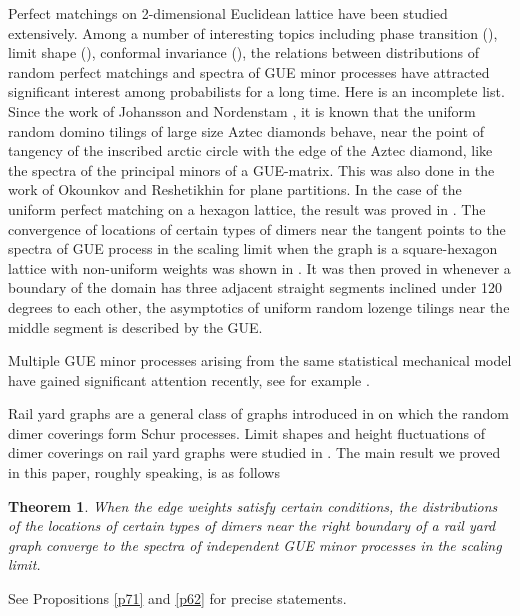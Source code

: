 \documentclass[11pt]{amsart}
\theoremstyle{plain}
\newtheorem{theorem}{Theorem}
\theoremstyle{definition}
\theoremstyle{remark}
\numberwithin{equation}{section}
\numberwithin{theorem}{section}
\numberwithin{figure}{section}
\begin{document}
Perfect matchings on 2-dimensional Euclidean lattice have been studied extensively. Among a number of interesting topics including phase transition (\cite{KOS06}), limit shape (\cite{CKP01,ko07,BL17,ZL20,kr20,ZL18,Li21,ZL20,LV21,ZL22,BD23,BB23}), conformal invariance (\cite{RK00,RK01,JD15,Li13,DJ19,BC21}),
the relations between distributions of random perfect matchings and spectra of GUE minor processes have attracted significant interest among probabilists for a long time. Here is an incomplete list. 
 Since the work of Johansson and Nordenstam
\cite{JN06}, it is known that the uniform random domino tilings of large size Aztec diamonds behave,
near the point of tangency of the inscribed arctic circle with the edge of the Aztec
diamond, like the spectra of the principal minors of a GUE-matrix. This was also
done in the work of Okounkov and Reshetikhin \cite{OR06} for plane partitions.
In the case
of the uniform perfect matching on a hexagon lattice, the result was proved in
\cite{VP15,JN14}. The convergence of locations of certain types of dimers near the tangent points to the spectra of GUE process in the scaling limit when the graph is a square-hexagon lattice with non-uniform weights was shown in \cite{BL17}. It was then proved in \cite{GA22} whenever a boundary of the domain has three adjacent straight segments inclined under 120 degrees to each other, the asymptotics of uniform random lozenge tilings near the middle segment is described by the GUE.

Multiple GUE minor processes arising from the same statistical mechanical model have gained significant attention recently, see for example \cite{AM13,NST23}.

Rail yard graphs are a general class of graphs introduced in \cite{bbccr} on which the random dimer coverings form Schur processes. Limit shapes and height fluctuations of dimer coverings on rail yard graphs were studied in \cite{Li21,LV21,ZL22}. The main result we proved in this paper, roughly speaking, is as follows

\begin{theorem}
 When the edge weights satisfy certain conditions, the distributions of the locations of certain types of dimers near the right boundary of a rail yard graph converge to the spectra of independent GUE minor processes in the scaling limit.
\end{theorem}
See Propositions \ref{p71} and \ref{p62} for precise statements.
\end{document}
